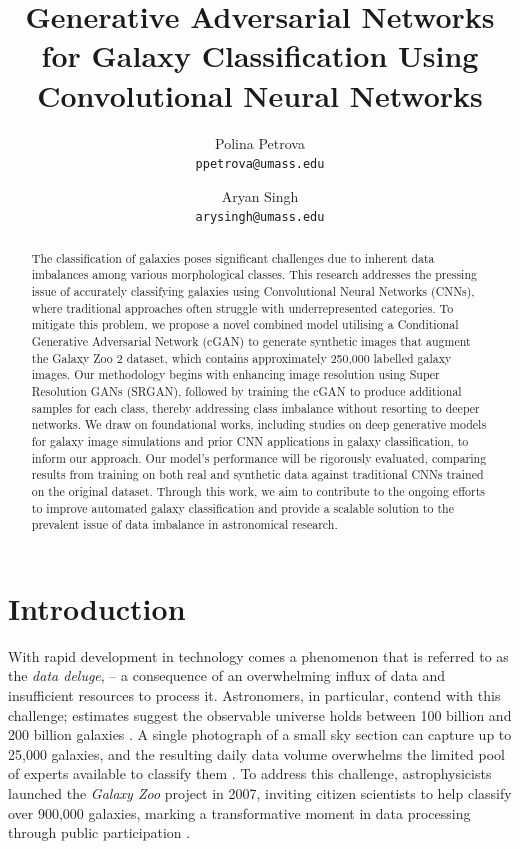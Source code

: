 \documentclass[10pt,twocolumn,letterpaper]{article}
\title{Generative Adversarial Networks for Galaxy Classification Using Convolutional
Neural Networks}
\author{Polina Petrova\\
{\tt\small ppetrova@umass.edu}
\and
Aryan Singh\\
{\tt\small arysingh@umass.edu}
}
\begin{document}
\maketitle
\begin{abstract}
    The classification of galaxies poses significant challenges due to inherent data imbalances among various morphological classes. 
    This research addresses the pressing issue of accurately classifying galaxies using Convolutional Neural Networks (CNNs), where traditional approaches often struggle with underrepresented categories. 
    To mitigate this problem, we propose a novel combined model utilising a Conditional Generative Adversarial Network (cGAN) to generate synthetic images that augment the Galaxy Zoo 2 dataset, which contains approximately 250,000 labelled galaxy images. 
    Our methodology begins with enhancing image resolution using Super Resolution GANs (SRGAN), followed by training the cGAN to produce additional samples for each class, thereby addressing class imbalance without resorting to deeper networks. 
    We draw on foundational works, including studies on deep generative models for galaxy image simulations and prior CNN applications in galaxy classification, to inform our approach. 
    Our model's performance will be rigorously evaluated, comparing results from training on both real and synthetic data against traditional CNNs trained on the original dataset. 
    Through this work, we aim to contribute to the ongoing efforts to improve automated galaxy classification and provide a scalable solution to the prevalent issue of data imbalance in astronomical research.
\end{abstract}

\section{Introduction}
With rapid development in technology comes a phenomenon that is referred to as the \textit{data deluge}, – a consequence of an overwhelming influx of data and insufficient resources to process it. 
Astronomers, in particular, contend with this challenge; estimates suggest the observable universe holds between 100 billion and 200 billion galaxies \cite{Howell2018}.
A single photograph of a small sky section can capture up to 25,000 galaxies, and the resulting daily data volume overwhelms the limited pool of experts available to classify them \cite{Sauers2023}.
To address this challenge, astrophysicists launched the \textit{Galaxy Zoo} project in 2007, inviting citizen scientists to help classify over 900,000 galaxies, marking a transformative moment in data processing through public participation \cite{McGourty2007}.
\end{document}
